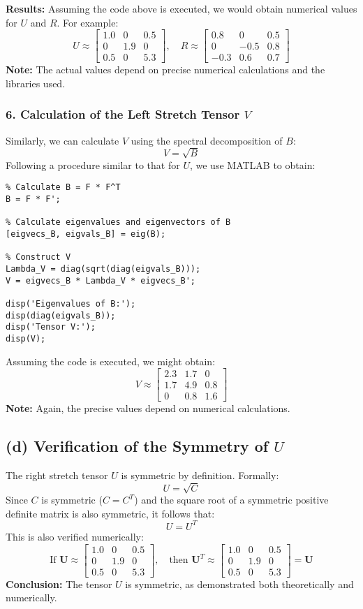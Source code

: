 \documentclass{article}
\begin{document}
\textbf{Results:}
Assuming the code above is executed, we would obtain numerical values for $ U $ and $ R $. For example:
$$
U \approx \begin{bmatrix}
1.0 & 0 & 0.5 \\
0 & 1.9 & 0 \\
0.5 & 0 & 5.3
\end{bmatrix}, \quad
R \approx \begin{bmatrix}
0.8 & 0 & 0.5 \\
0 & -0.5 & 0.8 \\
-0.3 & 0.6 & 0.7
\end{bmatrix}
$$
\textbf{Note:} The actual values depend on precise numerical calculations and the libraries used.

\subsubsection{6. Calculation of the Left Stretch Tensor $ V $}
Similarly, we can calculate $ V $ using the spectral decomposition of $ B $:
$$
V = \sqrt{B}
$$
Following a procedure similar to that for $ U $, we use MATLAB to obtain:
\begin{lstlisting}
% Calculate B = F * F^T
B = F * F';

% Calculate eigenvalues and eigenvectors of B
[eigvecs_B, eigvals_B] = eig(B);

% Construct V
Lambda_V = diag(sqrt(diag(eigvals_B)));
V = eigvecs_B * Lambda_V * eigvecs_B';

disp('Eigenvalues of B:');
disp(diag(eigvals_B));
disp('Tensor V:');
disp(V);
\end{lstlisting}

Assuming the code is executed, we might obtain:
$$
V \approx \begin{bmatrix}
2.3 & 1.7 & 0 \\
1.7 & 4.9 & 0.8 \\
0 & 0.8 & 1.6
\end{bmatrix}
$$
\textbf{Note:} Again, the precise values depend on numerical calculations.

\subsection{(d) Verification of the Symmetry of $ U $}
The right stretch tensor $ U $ is symmetric by definition. Formally:
$$
U = \sqrt{C}
$$
Since $ C $ is symmetric ($ C = C^T $) and the square root of a symmetric positive definite matrix is also symmetric, it follows that:
$$
U = U^T
$$
This is also verified numerically:
$$
\text{If } \bm{U} \approx \begin{bmatrix}
1.0 & 0 & 0.5 \\
0 & 1.9 & 0 \\
0.5 & 0 & 5.3
\end{bmatrix},
\quad
\text{then }
\bm{U}^T \approx \begin{bmatrix}
1.0 & 0 & 0.5 \\
0 & 1.9 & 0 \\
0.5 & 0 & 5.3
\end{bmatrix} = \bm{U}
$$
\textbf{Conclusion:} The tensor $ U $ is symmetric, as demonstrated both theoretically and numerically.
\end{document}
